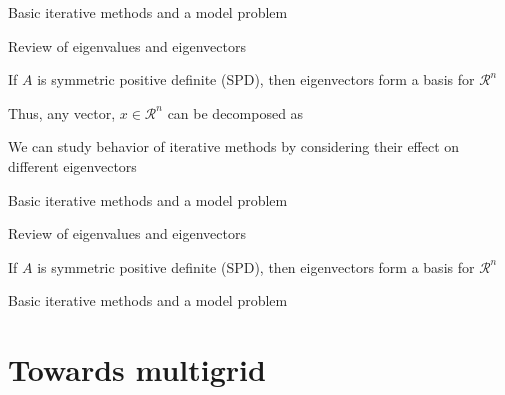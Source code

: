 \documentclass[18pt,xcolor=table]{beamer}
\begin{document}
\begin{frame}{Basic iterative methods and a model problem}
\begin{block}{Review of eigenvalues and eigenvectors}
\bit
\item If $A$ is symmetric positive definite (SPD), then eigenvectors form a basis for $\mathcal{R}^n$
\item Thus, any vector, $x\in\mathcal{R}^n$ can be decomposed as 
\item We can study behavior of iterative methods by considering their effect on different eigenvectors
\eit
\end{block}
\end{frame}

\begin{frame}{Basic iterative methods and a model problem}
\begin{block}{Review of eigenvalues and eigenvectors}
\bit
\item If $A$ is symmetric positive definite (SPD), then eigenvectors form a basis for $\mathcal{R}^n$
\eit
\end{block}
\end{frame}




\begin{frame}{Basic iterative methods and a model problem}
\begin{block}{}
\bit
\item 
\eit
\end{block}
\end{frame}




\section{Towards multigrid}


\end{document}
